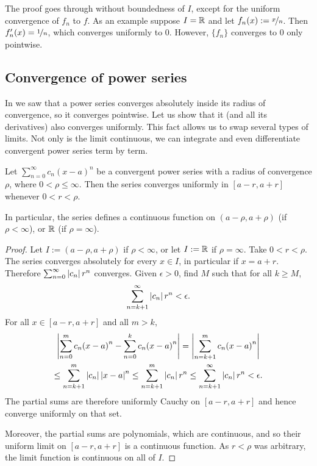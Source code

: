 The proof goes through without boundedness of $I$, except for the
uniform convergence of $f_n$ to $f$.  As an example suppose $I = {\mathbb{R}}$ and let
$f_n(x) := \nicefrac{x}{n}$.  Then $f_n'(x)=\nicefrac{1}{n}$, which
converges uniformly to $0$.  However, $\{f_n\}$ converges to 0 only pointwise.

\subsection{Convergence of power series}

In  we saw that a power series converges
absolutely inside its radius of convergence, so it converges pointwise.
Let us show that it (and all its derivatives) also converges uniformly.
This fact allows us to
swap several types of limits.  Not only is the limit continuous,
we can
integrate and even differentiate convergent power series term by term.

\begin{prop}
Let $\sum_{n=0}^\infty c_n {(x-a)}^n$ be a convergent power series with a radius
of convergence $\rho$, where $0 < \rho \leq \infty$.
Then the series converges uniformly
in $[a-r,a+r]$ whenever $0 < r < \rho$.

In particular, the series defines a continuous function
on $(a-\rho,a+\rho)$ (if $\rho < \infty$), or ${\mathbb{R}}$ (if $\rho = \infty$).
\end{prop}

\begin{proof}
Let $I := (a-\rho,a+\rho)$ if $\rho < \infty$,
or let $I := {\mathbb{R}}$ if $\rho= \infty$.
Take $0 < r < \rho$.
The series converges absolutely for every $x \in I$,
in particular if $x = a+r$.
Therefore $\sum_{n=0}^\infty \left\lvert {c_n} \right\rvert r^n$ converges.
Given $\epsilon >0$, find $M$ such that for all $k \geq M$,
\begin{equation*}
\sum_{n=k+1}^\infty \left\lvert {c_n} \right\rvert {r}^n < \epsilon .
\end{equation*}
For all $x \in [a-r,a+r]$ and all $m > k$,
\begin{multline*}
\left\lvert {\sum_{n=0}^m c_n {(x-a)}^n - 
\sum_{n=0}^k c_n {(x-a)}^n} \right\rvert
=
\left\lvert {\sum_{n=k+1}^m c_n {(x-a)}^n} \right\rvert
\\
\leq
\sum_{n=k+1}^m \left\lvert {c_n} \right\rvert {\left\lvert {x-a} \right\rvert}^n
\leq
\sum_{n=k+1}^m \left\lvert {c_n} \right\rvert {r}^n
\leq
\sum_{n=k+1}^\infty \left\lvert {c_n} \right\rvert {r}^n
<\epsilon.
\end{multline*}
The partial sums are therefore uniformly Cauchy on $[a-r,a+r]$ and
hence converge uniformly on that set.

Moreover, the partial sums are polynomials, which are
continuous, and so their uniform limit on $[a-r,a+r]$
is a continuous function.
As $r < \rho$ was arbitrary, the limit function
is continuous on all of $I$.
\end{proof}


